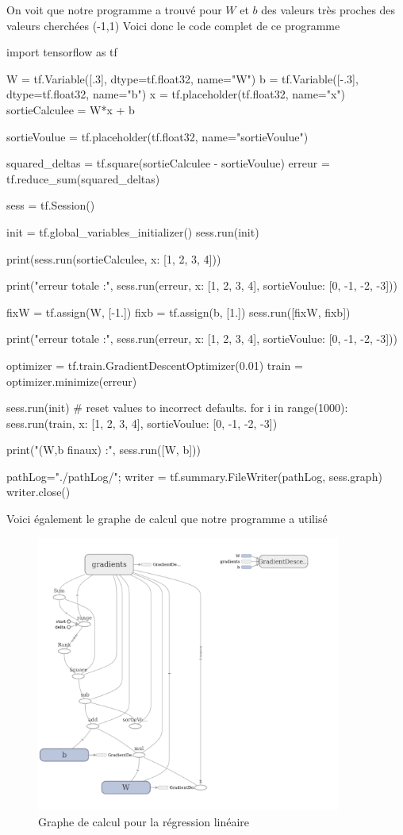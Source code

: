 \documentclass[a4paper,11pt]{book}
\theoremstyle{theo}
\begin{document}
On voit que notre programme a trouvé pour $W$ et $b$ des valeurs très proches des valeurs cherchées (-1,1)
Voici donc le code complet de ce programme
\begin{mypython}
import tensorflow as tf

W = tf.Variable([.3], dtype=tf.float32, name="W")
b = tf.Variable([-.3], dtype=tf.float32, name="b")
x = tf.placeholder(tf.float32, name="x")
sortieCalculee = W*x + b

sortieVoulue = tf.placeholder(tf.float32, name="sortieVoulue")

squared_deltas = tf.square(sortieCalculee - sortieVoulue)
erreur = tf.reduce_sum(squared_deltas)


sess = tf.Session()


init = tf.global_variables_initializer()
sess.run(init)


print(sess.run(sortieCalculee, {x: [1, 2, 3, 4]}))

print("erreur totale :", sess.run(erreur, {x: [1, 2, 3, 4], sortieVoulue: [0, -1, -2, -3]}))


fixW = tf.assign(W, [-1.])
fixb = tf.assign(b, [1.])
sess.run([fixW, fixb])

print("erreur totale :", sess.run(erreur, {x: [1, 2, 3, 4], sortieVoulue: [0, -1, -2, -3]}))


optimizer = tf.train.GradientDescentOptimizer(0.01)
train = optimizer.minimize(erreur)

sess.run(init) # reset values to incorrect defaults.
for i in range(1000):
  sess.run(train, {x: [1, 2, 3, 4], sortieVoulue: [0, -1, -2, -3]})

print("(W,b finaux) :", sess.run([W, b]))

pathLog="./pathLog/";
writer = tf.summary.FileWriter(pathLog, sess.graph)
writer.close()
\end{mypython}
Voici également le graphe de calcul que notre programme a utilisé
\begin{figure}[H]

\begin{center}
\includegraphics[width=10cm]{./figures/graphRegressionLineaire.png} 
\end{center}
\caption{Graphe de calcul pour la régression linéaire}
\end{figure}
\end{document}
